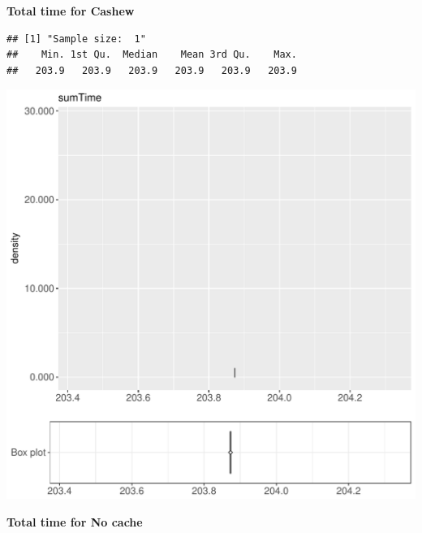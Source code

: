 \documentclass{article}\usepackage[]{graphicx}\usepackage[]{color}
\makeatletter
\def\maxwidth{ %
  \ifdim\Gin@nat@width>\linewidth
    \linewidth
  \else
    \Gin@nat@width
  \fi
}
\newenvironment{kframe}{%
 \def\at@end@of@kframe{}%
 \ifinner\ifhmode%
  \def\at@end@of@kframe{\end{minipage}}%
  \begin{minipage}{\columnwidth}%
 \fi\fi%
 \def\FrameCommand##1{\hskip\@totalleftmargin \hskip-\fboxsep
 \colorbox{shadecolor}{##1}\hskip-\fboxsep
     \hskip-\linewidth \hskip-\@totalleftmargin \hskip\columnwidth}%
 \MakeFramed {\advance\hsize-\width
   \@totalleftmargin\z@ \linewidth\hsize
   \@setminipage}}%
 {\par\unskip\endMakeFramed%
 \at@end@of@kframe}
\newenvironment{knitrout}{}{} %
\makeatother
\begin{document}
 \textbf{Total time for Cashew}
\begin{knitrout}
\color{fgcolor}\begin{kframe}
\begin{verbatim}
## [1] "Sample size:  1"
##    Min. 1st Qu.  Median    Mean 3rd Qu.    Max. 
##   203.9   203.9   203.9   203.9   203.9   203.9
\end{verbatim}


{\ttfamily\noindent\bfseries{}}\end{kframe}
\includegraphics[width=\maxwidth]{figure/RH1_cashew_password-1} 

\end{knitrout}
 \textbf{Total time for No cache}
\end{document}
